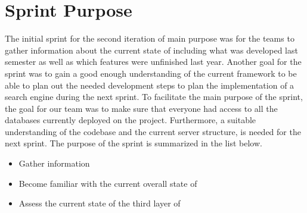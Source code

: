 \section{Sprint Purpose}
The initial sprint for the second iteration of \knox{} main purpose was for the teams to gather information about the current state of \knox{} including what was developed last semester as well as which features were unfinished last year. 
Another goal for the sprint was to gain a good enough understanding of the current framework to be able to plan out the needed development steps to plan the implementation of a search engine during the next sprint. 
To facilitate the main purpose of the sprint, the goal for our team was to make sure that everyone had access to all the databases currently deployed on the \knox{} project. 
Furthermore, a suitable understanding of the codebase and the current server structure, is needed for the next sprint.
The purpose of the sprint is summarized in the list below.

\begin{itemize}
    \item Gather information
    \item Become familiar with the current overall state of \knox{}
    \item Assess the current state of the third layer of \knox{}
\end{itemize}